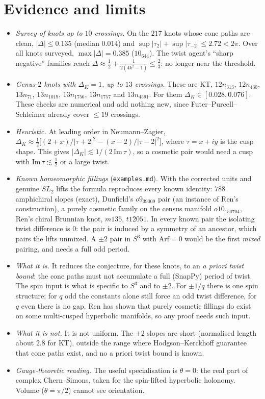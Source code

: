 \documentclass[10pt]{amsart}
\begin{document}
\section{Evidence and limits}

\begin{itemize}
\item \emph{Survey of knots up to $10$ crossings.} On the $217$ knots whose cone paths are clean,
$|\Delta|\le0.135$ (median $0.014$) and $\sup|\tau_2|+\sup|\tau_{-2}|\le2.72<2\pi$. Over all knots surveyed, $\max|\Delta|=0.385$
($10_{644}$). The twist agent's ``sharp negative'' families reach $\Delta\approx\tfrac12+\tfrac1{2(4k^2-1)}\le\tfrac23$: no longer near the threshold.
\item \emph{Genus-$2$ knots with $\Delta_K=1$, up to $13$ crossings.} These are KT, $12n_{313}$, $12n_{430}$,
$13n_{71}$, $13n_{1019}$, $13n_{1756}$, $13n_{1757}$ and $13n_{4591}$. For them $\Delta_K\in[0.028,0.076]$.
These checks are numerical and add nothing new, since Futer--Purcell--Schleimer already cover $\le19$ crossings.
\item \emph{Heuristic.} At leading order in Neumann--Zagier,
$\Delta_K\approx\tfrac12\bigl[(2+x)/|\tau+2|^2-(x-2)/|\tau-2|^2\bigr]$, where $\tau=x+iy$ is the cusp shape.
This gives $|\Delta_K|\lesssim1/(2\,\mathrm{Im}\,\tau)$, so a cosmetic pair would need a cusp with
$\mathrm{Im}\,\tau\lesssim\tfrac12$ or a large twist.
\item \emph{Known homeomorphic fillings} (\texttt{examples.md}). With the corrected units and genuine $SL_2$ lifts the formula
reproduces every known identity: $788$ amphichiral slopes (exact), Dunfield's $o9_{39009}$ pair (an instance of Ren's construction),
a purely cosmetic family on the census manifold $o10_{150704}$, Ren's chiral Brunnian knot, $m135$, $t12051$. In every known pair
the isolating twist difference is $0$: the pair is induced by a symmetry of an ancestor, which pairs the lifts unmixed.
A $\pm2$ pair in $S^3$ with $\mathrm{Arf}=0$ would be the first \emph{mixed} pairing, and needs a full odd period.
\item \emph{What it is.} It reduces the conjecture, for these knots, to an \emph{a priori twist bound}: the
cone paths must not accumulate a full (SnapPy) period of twist. The spin input is what is specific to $S^3$ and to $\pm2$.
For $\pm1/q$ there is one spin structure; for $q$ odd the constants alone still force an odd twist difference, for $q$ even there is no gap. Ren has shown that purely cosmetic fillings do exist
on some multi-cusped hyperbolic manifolds, so any proof needs such input.
\item \emph{What it is not.} It is not uniform. The $\pm2$ slopes are short (normalised length about $2.8$ for KT),
outside the range where Hodgson--Kerckhoff guarantee that cone paths exist, and no a priori twist bound is known.
\item \emph{Gauge-theoretic reading.} The useful specialisation is $\theta=0$: the real part of complex
Chern--Simons, taken for the spin-lifted hyperbolic holonomy. Volume ($\theta=\pi/2$) cannot see orientation.
\end{itemize}
\end{document}
